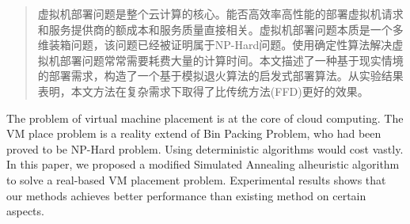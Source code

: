 \begin{abstract}
虚拟机部署问题是整个云计算的核心。能否高效率高性能的部署虚拟机请求和服务提供商的额成本和服务质量直接相关。虚拟机部署问题本质是一个多维装箱问题，该问题已经被证明属于NP-Hard问题。使用确定性算法解决虚拟机部署问题常常需要耗费大量的计算时间。本文描述了一种基于现实情境的部署需求，构造了一个基于模拟退火算法的启发式部署算法。从实验结果表明，本文方法在复杂需求下取得了比传统方法(FFD)更好的效果。
\end{abstract}


\begin{englishabstract}
The problem of virtual machine placement is at the core of cloud computing. The VM place problem is a reality extend of Bin Packing Problem, who had been proved to be NP-Hard problem. Using deterministic algorithms would cost vastly. In this paper, we proposed a modified Simulated Annealing alheuristic algorithm to solve a real-based VM placement problem. Experimental results shows that our methods achieves better performance than existing method on certain aspects.
\end{englishabstract}

\clearpage
